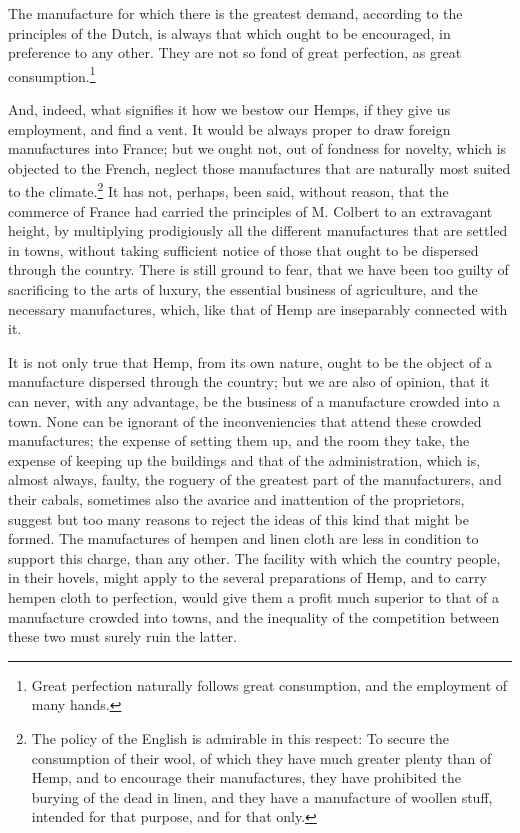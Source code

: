 \documentclass[a4paper, 11pt, oneside, polutonikogreek, english]{article}
\begin{document}
The manufacture for which there is the greatest demand, according to the principles of the Dutch, is always that which ought to be encouraged, in preference to any other. They are not so fond of great perfection, as great consumption.\footnote{Great perfection naturally follows great consumption, and the employment of many hands.}

And, indeed, what signifies it how we bestow our Hemps, if they give us employment, and find a vent. It would be always proper to draw foreign manufactures into France; but we ought not, out of fondness for novelty, which is objected to the French, neglect those manufactures that are naturally most suited to the climate.\footnote{The policy of the English is admirable in this respect: To secure the consumption of their wool, of which they have much greater plenty than of Hemp, and to encourage their manufactures, they have prohibited the burying of the dead in linen, and they have a manufacture of woollen stuff, intended for that purpose, and for that only.} It has not, perhaps, been said, without reason, that the commerce of France had carried the principles of M. Colbert to an extravagant height, by multiplying prodigiously all the different manufactures that are settled in towns, without taking sufficient notice of those that ought to be dispersed through the country. There is still ground to fear, that we have been too guilty of sacrificing to the arts of luxury, the essential business of agriculture, and the necessary manufactures, which, like that of Hemp are inseparably connected with it.

It is not only true that Hemp, from its own nature, ought to be the object of a manufacture dispersed through the country; but we are also of opinion, that it can never, with any advantage, be the business of a manufacture crowded into a town. None can be ignorant of the inconveniencies that attend these crowded manufactures; the expense of setting them up, and the room they take, the expense of keeping up the buildings and that of the administration, which is, almost always, faulty, the roguery of the greatest part of the manufacturers, and their cabals, sometimes also the avarice and inattention of the proprietors, suggest but too many reasons to reject the ideas of this kind that might be formed. The manufactures of hempen and linen cloth are less in condition to support this charge, than any other. The facility with which the country people, in their hovels, might apply to the several preparations of Hemp, and to carry hempen cloth to perfection, would give them a profit much superior to that of a manufacture crowded into towns, and the inequality of the competition between these two must surely ruin the latter.
\end{document}
